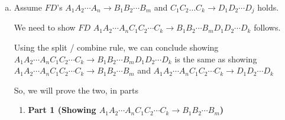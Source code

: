 \documentclass[12pt]{article}
\begin{document}
\begin{enumerate}[1.]
\begin{enumerate}[a)]







            \item

            Assume $FD$'s $A_1A_2 \cdots A_n \to B_1 B_2 \cdots B_m$ and $C_1 C_2 \dots C_k \to D_1 D_2 \cdots D_j$ holds.

            \bigskip

            We need to show $FD$ $A_1A_2 \cdots A_n C_1 C_2 \cdots C_k \to B_1 B_2 \cdots B_m D_1 D_2 \cdots D_k$ follows.

            \bigskip

            Using the split / combine rule, we can conclude showing $A_1A_2 \cdots A_n C_1 C_2 \cdots C_k \to B_1 B_2 \cdots B_m D_1 D_2 \cdots D_k$ is
            the same as showing $A_1A_2 \cdots A_n C_1 C_2 \cdots C_k \to B_1 B_2 \cdots B_m$ and
            $A_1A_2 \cdots A_n C_1 C_2 \cdots C_k \to D_1 D_2 \cdots D_k$

            \bigskip

            So, we will prove the two, in parts

            \bigskip

            \begin{enumerate}[1.]
                \item \textbf{Part 1 (Showing $A_1A_2 \cdots A_n C_1 C_2 \cdots C_k \to B_1 B_2 \cdots B_m$)}


\end{enumerate}
\end{enumerate}
\end{enumerate}
\end{document}
